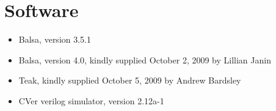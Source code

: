 \section{Software}


\begin{itemize}
  \item Balsa, version 3.5.1
  \item Balsa, version 4.0, kindly supplied October 2, 2009 by Lillian Janin
  \item Teak, kindly supplied October 5, 2009 by Andrew Bardsley
  \item CVer verilog simulator, version 2.12a-1
\end{itemize}
